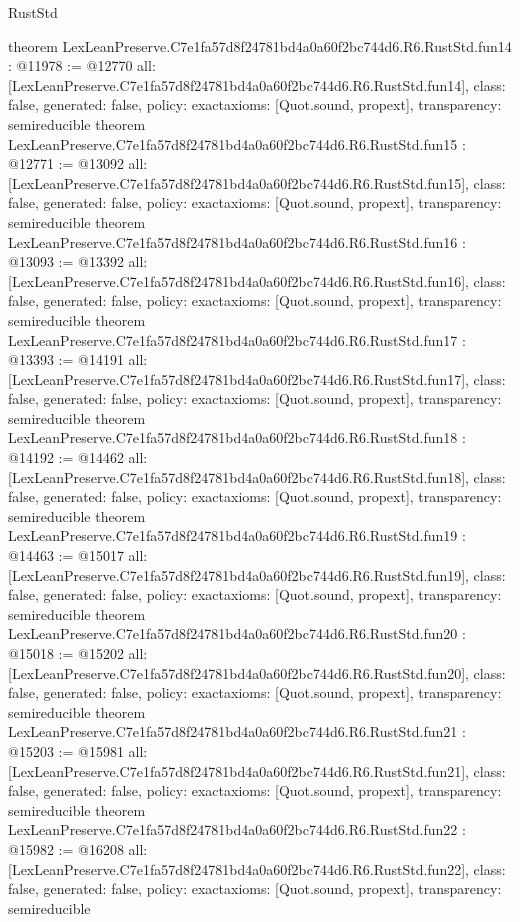 \begin{lexlean}{RustStd}
\begin{coremodule}
{}
theorem LexLeanPreserve.C7e1fa57d8f24781bd4a0a60f2bc744d6.R6.RustStd.fun14 : @11978 := @12770 {
  all: [LexLeanPreserve.C7e1fa57d8f24781bd4a0a60f2bc744d6.R6.RustStd.fun14],
  class: false,
  generated: false,
  policy: exact{axioms: [Quot.sound, propext]},
  transparency: semireducible
}
theorem LexLeanPreserve.C7e1fa57d8f24781bd4a0a60f2bc744d6.R6.RustStd.fun15 : @12771 := @13092 {
  all: [LexLeanPreserve.C7e1fa57d8f24781bd4a0a60f2bc744d6.R6.RustStd.fun15],
  class: false,
  generated: false,
  policy: exact{axioms: [Quot.sound, propext]},
  transparency: semireducible
}
theorem LexLeanPreserve.C7e1fa57d8f24781bd4a0a60f2bc744d6.R6.RustStd.fun16 : @13093 := @13392 {
  all: [LexLeanPreserve.C7e1fa57d8f24781bd4a0a60f2bc744d6.R6.RustStd.fun16],
  class: false,
  generated: false,
  policy: exact{axioms: [Quot.sound, propext]},
  transparency: semireducible
}
theorem LexLeanPreserve.C7e1fa57d8f24781bd4a0a60f2bc744d6.R6.RustStd.fun17 : @13393 := @14191 {
  all: [LexLeanPreserve.C7e1fa57d8f24781bd4a0a60f2bc744d6.R6.RustStd.fun17],
  class: false,
  generated: false,
  policy: exact{axioms: [Quot.sound, propext]},
  transparency: semireducible
}
theorem LexLeanPreserve.C7e1fa57d8f24781bd4a0a60f2bc744d6.R6.RustStd.fun18 : @14192 := @14462 {
  all: [LexLeanPreserve.C7e1fa57d8f24781bd4a0a60f2bc744d6.R6.RustStd.fun18],
  class: false,
  generated: false,
  policy: exact{axioms: [Quot.sound, propext]},
  transparency: semireducible
}
theorem LexLeanPreserve.C7e1fa57d8f24781bd4a0a60f2bc744d6.R6.RustStd.fun19 : @14463 := @15017 {
  all: [LexLeanPreserve.C7e1fa57d8f24781bd4a0a60f2bc744d6.R6.RustStd.fun19],
  class: false,
  generated: false,
  policy: exact{axioms: [Quot.sound, propext]},
  transparency: semireducible
}
theorem LexLeanPreserve.C7e1fa57d8f24781bd4a0a60f2bc744d6.R6.RustStd.fun20 : @15018 := @15202 {
  all: [LexLeanPreserve.C7e1fa57d8f24781bd4a0a60f2bc744d6.R6.RustStd.fun20],
  class: false,
  generated: false,
  policy: exact{axioms: [Quot.sound, propext]},
  transparency: semireducible
}
theorem LexLeanPreserve.C7e1fa57d8f24781bd4a0a60f2bc744d6.R6.RustStd.fun21 : @15203 := @15981 {
  all: [LexLeanPreserve.C7e1fa57d8f24781bd4a0a60f2bc744d6.R6.RustStd.fun21],
  class: false,
  generated: false,
  policy: exact{axioms: [Quot.sound, propext]},
  transparency: semireducible
}
theorem LexLeanPreserve.C7e1fa57d8f24781bd4a0a60f2bc744d6.R6.RustStd.fun22 : @15982 := @16208 {
  all: [LexLeanPreserve.C7e1fa57d8f24781bd4a0a60f2bc744d6.R6.RustStd.fun22],
  class: false,
  generated: false,
  policy: exact{axioms: [Quot.sound, propext]},
  transparency: semireducible
}
\end{coremodule}
\end{lexlean}
